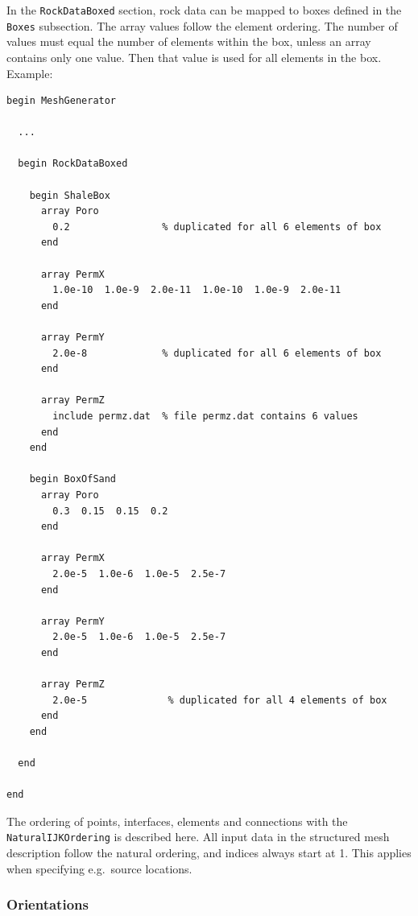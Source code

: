 In the \texttt{RockDataBoxed} section, rock data can be mapped to
boxes defined in the \texttt{Boxes} subsection. The array values
follow the element ordering. The number of values must equal the
number of elements within the box, unless an array contains only one
value. Then that value is used for all elements in the box. Example:
%
\begin{verbatim}
begin MeshGenerator

  ... 

  begin RockDataBoxed

    begin ShaleBox
      array Poro
        0.2                % duplicated for all 6 elements of box
      end

      array PermX
        1.0e-10  1.0e-9  2.0e-11  1.0e-10  1.0e-9  2.0e-11
      end

      array PermY
        2.0e-8             % duplicated for all 6 elements of box
      end

      array PermZ
        include permz.dat  % file permz.dat contains 6 values
      end
    end

    begin BoxOfSand
      array Poro
        0.3  0.15  0.15  0.2
      end

      array PermX
        2.0e-5  1.0e-6  1.0e-5  2.5e-7
      end

      array PermY
        2.0e-5  1.0e-6  1.0e-5  2.5e-7
      end

      array PermZ
        2.0e-5              % duplicated for all 4 elements of box
      end
    end

  end

end
\end{verbatim}





\label{sec:natural-orient-numbering}

The ordering of points, interfaces, elements and connections with the
\texttt{NaturalIJKOrdering} is described here. All input data in the
structured mesh description follow the natural ordering, and indices
always start at 1. This applies when specifying e.g.~source locations.

\subsubsection{Orientations}

